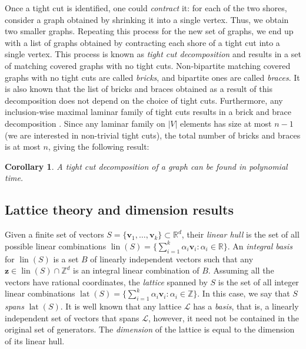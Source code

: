 \documentclass[11pt]{article}
\DeclareMathOperator{\lat}{lat}
\DeclareMathOperator{\lin}{lin}
\newcommand{\1}{\mathbf{1}}
\newcommand{\0}{\mathbf{0}}
\newcommand{\zL}{\mathcal L}
\newcommand{\Z}{\mathbb{Z}}
\newcommand{\R}{\mathbb{R}}
\newtheorem{CO}[theorem]{Corollary}
\begin{document}
Once a tight cut is identified, one could \emph{contract} it: for each of the two shores, consider a graph obtained by shrinking it into a single vertex. Thus, we obtain two smaller graphs. Repeating this process for the new set of graphs, we end up with a list of graphs obtained by contracting each shore of a tight cut into a single vertex. This process is known as \emph{tight cut decomposition} and results in a set of matching covered graphs with no tight cuts. Non-bipartite matching covered graphs with no tight cuts are called \emph{bricks}, and bipartite ones are called \emph{braces}. It is also known that the list of bricks and braces obtained as a result of this decomposition does not depend on the choice of tight cuts. Furthermore, any inclusion-wise maximal laminar family of tight cuts results in a brick and brace decomposition \cite{lovaszPM}. Since any laminar family on $|V|$ elements has size at most $n-1$ (we are interested in non-trivial tight cuts), the total number of bricks and braces is at most $n$, giving the following result:
\begin{CO}
    A tight cut decomposition of a graph can be found in polynomial time.
\end{CO}

\subsection{Lattice theory and dimension results}

Given a finite set of vectors $S =\{\mathbf{v}_1, \ldots, \mathbf{v}_k\} \subset \R^d$, their \emph{linear hull} is the set of all possible linear combinations $\lin(S) = \{\sum_{i=1}^k \alpha_i \mathbf{v}_i : \alpha_i \in \R\}$. An \emph{integral basis} for $\lin(S)$ is a set $B$ of linearly independent vectors such that any $\mathbf{z}\in \lin(S)\cap \Z^d$ is an integral linear combination of $B$. Assuming all the vectors have rational coordinates, the \emph{lattice} spanned by $S$ is the set of all integer linear combinations $\lat(S)=\{\sum_{i=1}^k \alpha_i \mathbf{v}_i: \alpha_i \in \Z\}$. In this case, we say that $S$ \emph{spans} $\lat(S)$. It is well known that any lattice $\zL$ has a \emph{basis}, that is, a linearly independent set of vectors that spans $\zL$, however, it need not be contained in the original set of generators. The \emph{dimension} of the lattice is equal to the dimension of its linear hull.
\end{document}

